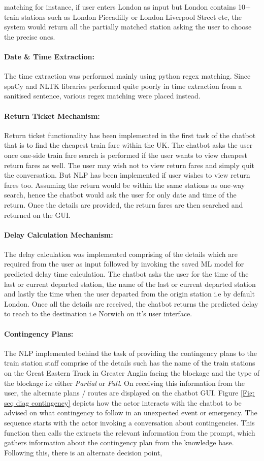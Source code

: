 matching for instance, if user enters London as input but London contains 10+ train stations such as London Piccadilly or London Liverpool Street etc, the system would return all the partially matched station asking the user to choose the precise ones. \paragraph{Date \& Time Extraction:} The time extraction was performed mainly using python regex matching. Since spaCy and NLTK libraries performed quite poorly in time extraction from a sanitised sentence, various regex matching were placed instead. \paragraph{Return Ticket Mechanism:} Return ticket functionality has been implemented in the first task of the chatbot that is to find the cheapest train fare within the UK. The chatbot asks the user once one-side train fare search is performed if the user wants to view cheapest return fares as well. The user may wish not to view return fares and simply quit the conversation. But NLP has been implemented if user wishes to view return fares too. Assuming the return would be within the same stations as one-way search, hence the chatbot would ask the user for only date and time of the return. Once the details are provided, the return fares are then searched and returned on the GUI. \paragraph{Delay Calculation Mechanism:} The delay calculation was implemented comprising of the details which are required from the user as input followed by invoking the saved ML model for predicted delay time calculation. The chatbot asks the user for the time of the last or current departed station, the name of the last or current departed station and lastly the time when the user departed from the origin station i.e by default London. Once all the details are received, the chatbot returns the predicted delay to reach to the destination i.e Norwich on it's user interface. \paragraph{Contingency Plans:} The NLP implemented behind the task of providing the contingency plans to the train station staff comprise of the details such has the name of the train stations on the Great Eastern Track in Greater Anglia facing the blockage and the type of the blockage i.e either \textit{Partial} or \textit{Full}. On receiving this information from the user, the alternate plans / routes are displayed on the chatbot GUI. Figure \ref{Fig: seq diag contingency} depicts how the actor interacts with the chatbot to be advised on what contingency to follow in an unexpected event or emergency. The sequence starts with the actor invoking a conversation about contingencies. This function then calls the extracts the relevant information from the prompt, which gathers information about the contingency plan from the knowledge base. Following this, there is an alternate decision point, 